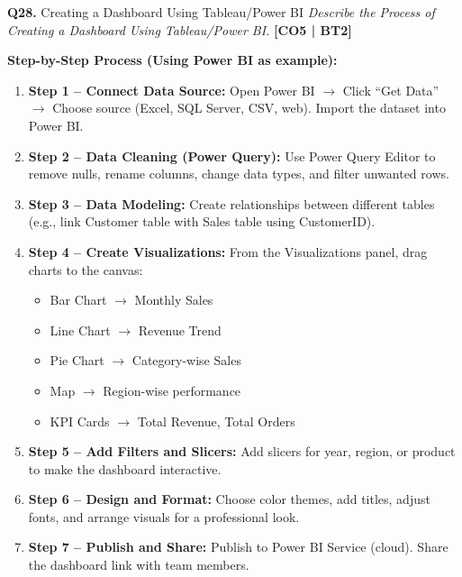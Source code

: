 \documentclass[12pt,a4paper]{article}
\newcommand{\Qno}[1]{\textbf{\color{darkred}Q#1.}}
\newcommand{\term}[1]{\textbf{\color{headingcolor}#1}}
\begin{document}
\vspace{8pt}

\begin{questionbox}{\Qno{28} Creating a Dashboard Using Tableau/Power BI}
\textit{Describe the Process of Creating a Dashboard Using Tableau/Power BI.} \hfill \textbf{[CO5 | BT2]}
\end{questionbox}

\begin{answerenv}

\textbf{\color{headingcolor}Step-by-Step Process (Using Power BI as example):}

\begin{enumerate}[leftmargin=1.8em, itemsep=5pt]
  \item \term{Step 1 -- Connect Data Source:}
  Open Power BI $\to$ Click ``Get Data'' $\to$ Choose source (Excel, SQL Server, CSV, web).
  Import the dataset into Power BI.

  \item \term{Step 2 -- Data Cleaning (Power Query):}
  Use Power Query Editor to remove nulls, rename columns, change data types, and filter unwanted rows.

  \item \term{Step 3 -- Data Modeling:}
  Create relationships between different tables (e.g., link Customer table with Sales table using CustomerID).

  \item \term{Step 4 -- Create Visualizations:}
  From the Visualizations panel, drag charts to the canvas:
  \begin{itemize}[leftmargin=1.5em]
    \item Bar Chart $\to$ Monthly Sales
    \item Line Chart $\to$ Revenue Trend
    \item Pie Chart $\to$ Category-wise Sales
    \item Map $\to$ Region-wise performance
    \item KPI Cards $\to$ Total Revenue, Total Orders
  \end{itemize}

  \item \term{Step 5 -- Add Filters and Slicers:}
  Add slicers for year, region, or product to make the dashboard interactive.

  \item \term{Step 6 -- Design and Format:}
  Choose color themes, add titles, adjust fonts, and arrange visuals for a professional look.

  \item \term{Step 7 -- Publish and Share:}
  Publish to Power BI Service (cloud). Share the dashboard link with team members.
\end{enumerate}

\end{answerenv}
\end{document}
